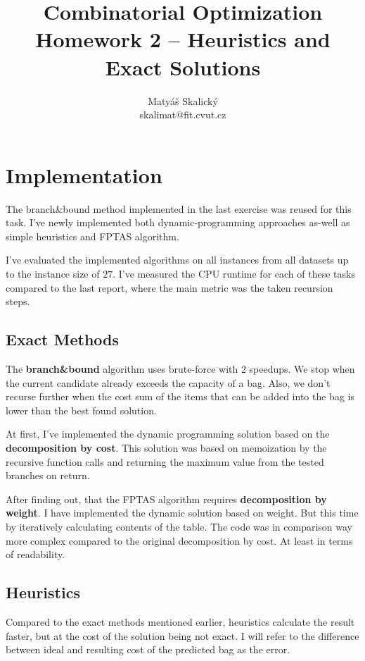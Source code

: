 \documentclass[a4paper,10pt]{article}
\title{Combinatorial Optimization\\Homework 2 – Heuristics and Exact Solutions}
\author{Matyáš Skalický\\skalimat@fit.cvut.cz}
\begin{document}
\maketitle
\tableofcontents
\medskip


\section{Implementation}
The branch\&bound method implemented in the last exercise was reused for this task. I've newly implemented both dynamic-programming approaches as-well as simple heuristics and FPTAS algorithm.

I've evaluated the implemented algorithms on all instances from all datasets up to the instance size of $27$. I've measured the CPU runtime for each of these tasks compared to the last report, where the main metric was the taken recursion steps.

\subsection{Exact Methods}

The \textbf{branch\&bound} algorithm uses brute-force with 2 speedups. We stop when the current candidate already exceeds the capacity of a bag. Also, we don't recurse further when the cost sum of the items that can be added into the bag is lower than the best found solution.

At first, I've implemented the dynamic programming solution based on the \textbf{decomposition by cost}. This solution was based on memoization by the recursive function calls and returning the maximum value from the tested branches on return.

After finding out, that the FPTAS algorithm requires \textbf{decomposition by weight}. I have implemented the dynamic solution based on weight. But this time by iteratively calculating contents of the table. The code was in comparison way more complex compared to the original decomposition by cost. At least in terms of readability.

\subsection{Heuristics}

Compared to the exact methods mentioned earlier, heuristics calculate the result faster, but at the cost of the solution being not exact. I will refer to the difference between ideal and resulting cost of the predicted bag as the error.
\end{document}
